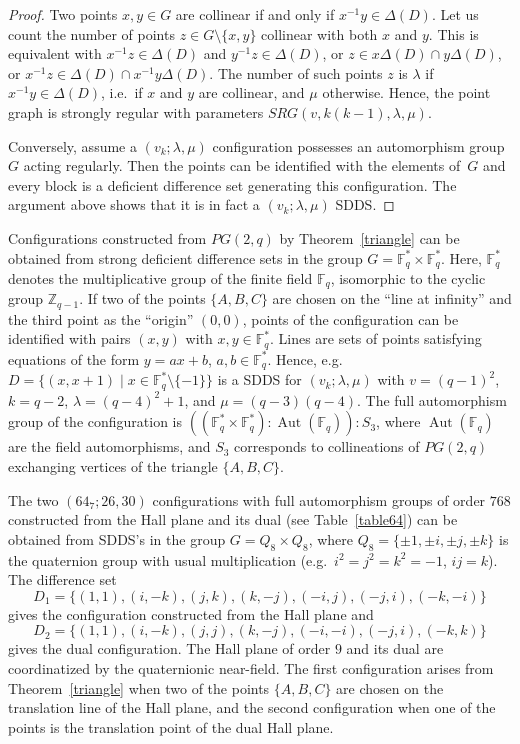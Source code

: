 \documentclass[12pt, reqno]{amsart}
\def\Z{\mathbb{Z}}
\def\F{\mathbb{F}}
\def\Aut{\mathop{\mathrm{Aut}}}
\begin{document}
\begin{proof}
Two points $x,y\in G$ are collinear if and only if $x^{-1}y\in
\Delta(D)$. Let us count the number of points $z\in
G\setminus\{x,y\}$ collinear with both $x$ and $y$. This is
equivalent with $x^{-1}z\in \Delta(D)$ and $y^{-1}z\in \Delta(D)$,
or $z\in x\Delta(D)\cap y\Delta(D)$, or $x^{-1}z \in \Delta(D)\cap
x^{-1}y\Delta(D)$. The number of such points $z$ is $\lambda$ if
$x^{-1}y\in \Delta(D)$, i.e.\ if $x$ and $y$ are collinear, and
$\mu$ otherwise. Hence, the point graph is strongly regular with
parameters $SRG(v,k(k-1),\lambda,\mu)$.

Conversely, assume a $(v_k;\lambda,\mu)$ configuration possesses an
automorphism group~$G$ acting regularly. Then the points can be identified
with the elements of~$G$ and every block is a deficient difference set
generating this configuration. The argument above shows that it is
in fact a $(v_k;\lambda,\mu)$ SDDS.
\end{proof}

Configurations constructed from $PG(2,q)$ by Theorem~\ref{triangle}
can be obtained from strong deficient difference sets in the group
$G=\F_q^*\times \F_q^*$. Here, $\F_q^*$ denotes the multiplicative group of
the finite field $\F_q$, isomorphic to the cyclic group $\Z_{q-1}$.
If two of the points $\{A,B,C\}$ are chosen on the ``line at infinity''
and the third point as the ``origin'' $(0,0)$, points of the configuration
can be identified with pairs $(x,y)$ with $x,y\in \F_q^*$. Lines are sets
of points satisfying equations of the form $y=ax+b$, $a,b\in\F_q^*$. Hence, e.g.\
$D=\{(x,x+1) \mid x\in \F_q^*\setminus \{-1\}\}$ is a
SDDS for $(v_k;\lambda,\mu)$ with $v=(q-1)^2$, $k=q-2$, $\lambda=(q-4)^2+1$, and $\mu=(q-3)(q-4)$.
The full automorphism group of the configuration is
$((\F_q^*\times \F_q^*):\Aut(\F_q)):S_3$, where $\Aut(\F_q)$ are the
field automorphisms, and $S_3$ corresponds to collineations of $PG(2,q)$
exchanging vertices of the triangle $\{A,B,C\}$.

The two $(64_7;26,30)$ configurations with full automorphism groups of order $768$
constructed from the Hall plane and its dual (see Table~\ref{table64})
can be obtained from SDDS's in the group $G=Q_8\times Q_8$, where $Q_8=\{\pm 1,\pm i,\pm j,\pm k\}$
is the quaternion group with usual multiplication (e.g.\
$i^2=j^2=k^2=-1$, $ij=k$). The difference set
$$D_1=\{(1,1), (i,-k), (j,k), (k,-j), (-i,j), (-j,i), (-k,-i)\}$$
gives the configuration constructed from the Hall plane and
$$D_2=\{(1,1), (i,-k), (j,j), (k,-j), (-i,-i), (-j,i), (-k,k)\}$$
gives the dual configuration. The Hall plane of order $9$ and its dual are
coordinatized by the quaternionic near-field. The first configuration
arises from Theorem~\ref{triangle} when two of the points $\{A,B,C\}$
are chosen on the translation line of the Hall plane, and the second configuration when one
of the points is the translation point of the dual Hall plane.
\end{document}

